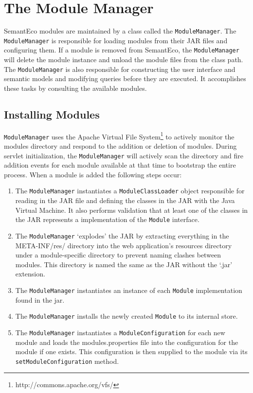 \documentclass[letterpaper]{report}
\begin{document}
\section{The Module Manager}
\label{module-manager}
SemantEco modules are maintained by a class called the \texttt{ModuleManager}. The \texttt{ModuleManager} is responsible for loading modules from their JAR files and configuring them. If a module is removed from SemantEco, the \texttt{ModuleManager} will delete the module instance and unload the module files from the class path. The \texttt{ModuleManager} is also responsible for constructing the user interface and semantic models and modifying queries before they are executed. It accomplishes these tasks by consulting the available modules.

\subsection{Installing Modules}
\label{installing-modules}
\texttt{ModuleManager} uses the Apache Virtual File System\footnote{http://commons.apache.org/vfs/} to actively monitor the modules directory and respond to the addition or deletion of modules. During servlet initialization, the \texttt{ModuleManager} will actively scan the directory and fire addition events for each module available at that time to bootstrap the entire process. When a module is added the following steps occur:

\begin{enumerate}
\item The \texttt{ModuleManager} instantiates a \texttt{ModuleClassLoader} object responsible for reading in the JAR file and defining the classes in the JAR with the Java Virtual Machine. It also performs validation that at least one of the classes in the JAR represents a implementation of the \texttt{Module} interface.
\item The \texttt{ModuleManager} `explodes' the JAR by extracting everything in the META-INF/res/ directory into the web application's resources directory under a module-specific directory to prevent naming clashes between modules. This directory is named the same as the JAR without the `.jar' extension.
\item The \texttt{ModuleManager} instantiates an instance of each \texttt{Module} implementation found in the jar.
\item The \texttt{ModuleManager} installs the newly created \texttt{Module} to its internal store.
\item The \texttt{ModuleManager} instantiates a \texttt{ModuleConfiguration} for each new module and loads the modules.properties file into the configuration for the module if one exists. This configuration is then supplied to the module via its \texttt{setModuleConfiguration} method.
\end{enumerate}
\end{document}
